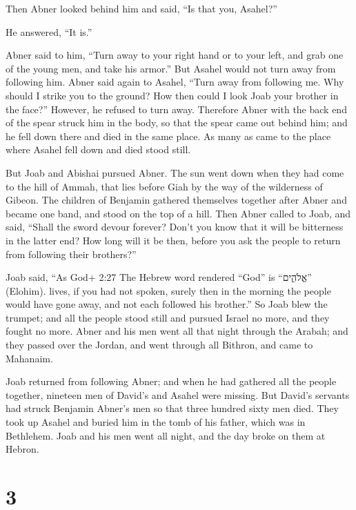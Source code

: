  Then Abner looked behind him and said, ``Is that you,
Asahel?''

He answered, ``It is.''

 Abner said to him, ``Turn away to your right hand or to
your left, and grab one of the young men, and take his armor.'' But
Asahel would not turn away from following him.  Abner said
again to Asahel, ``Turn away from following me. Why should I strike you
to the ground? How then could I look Joab your brother in the face?''
 However, he refused to turn away. Therefore Abner with the
back end of the spear struck him in the body, so that the spear came out
behind him; and he fell down there and died in the same place. As many
as came to the place where Asahel fell down and died stood still.

 But Joab and Abishai pursued Abner. The sun went down when
they had come to the hill of Ammah, that lies before Giah by the way of
the wilderness of Gibeon.  The children of Benjamin
gathered themselves together after Abner and became one band, and stood
on the top of a hill.  Then Abner called to Joab, and said,
``Shall the sword devour forever? Don't you know that it will be
bitterness in the latter end? How long will it be then, before you ask
the people to return from following their brothers?''

 Joab said, ``As God+ 2:27 The Hebrew word rendered ``God''
is ``אֱלֹהִ֑ים'' (Elohim). lives, if you had not spoken, surely then in
the morning the people would have gone away, and not each followed his
brother.''  So Joab blew the trumpet; and all the people
stood still and pursued Israel no more, and they fought no more.
 Abner and his men went all that night through the Arabah;
and they passed over the Jordan, and went through all Bithron, and came
to Mahanaim.

 Joab returned from following Abner; and when he had
gathered all the people together, nineteen men of David's and Asahel
were missing.  But David's servants had struck Benjamin
Abner's men so that three hundred sixty men died.  They
took up Asahel and buried him in the tomb of his father, which was in
Bethlehem. Joab and his men went all night, and the day broke on them at
Hebron.

\hypertarget{section-2}{%
\section{3}\label{section-2}}

